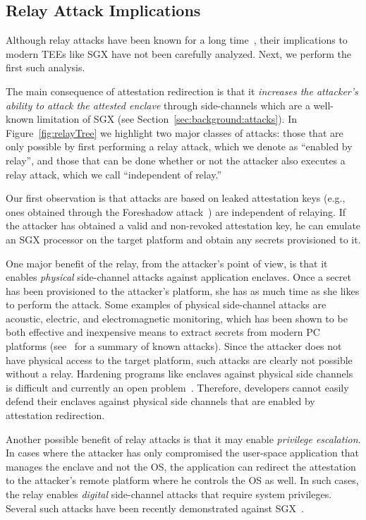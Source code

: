             
\subsection{Relay Attack Implications}
\label{sec:problemStatement:implication}

Although relay attacks have been known for a long time~\cite{parno2008bootstrapping}, their implications to modern TEEs like SGX have not been carefully analyzed. Next, we perform the first such analysis.

The main consequence of attestation redirection is that it \emph{increases the attacker's ability to attack the attested enclave} through side-channels which are a well-known limitation of SGX (see Section~\ref{sec:background:attacks}). In Figure~\ref{fig:relayTree} we highlight two major classes of attacks: those that are only possible by first performing a relay attack, which we denote as ``enabled by relay'', and those that can be done whether or not the attacker also executes a relay attack, which we call ``independent of relay.''


 Our first observation is that attacks are based on leaked attestation keys (e.g., ones obtained through the Foreshadow attack~\cite{foreshadow-usenix18}) are independent of relaying. If the attacker has obtained a valid and non-revoked attestation key, he can emulate an SGX processor on the target platform and obtain any secrets provisioned to it.


 One major benefit of the relay, from the attacker's point of view, is that it enables \emph{physical} side-channel attacks against application enclaves. Once a secret has been provisioned to the attacker's platform, she has as much time as she likes to perform the attack. Some examples of physical side-channel attacks are acoustic, electric, and electromagnetic monitoring, which has been shown to be both effective and inexpensive means to extract secrets from modern PC platforms (see~\cite{genkin2016physical} for a summary of known attacks). Since the attacker does not have physical access to the target platform, such attacks are clearly not possible without a relay. Hardening programs like enclaves against physical side channels is difficult and currently an open problem~\cite{genkin2016physical}. Therefore, developers cannot easily defend their enclaves against physical side channels that are enabled by attestation redirection.


Another possible benefit of relay attacks is that it may enable \emph{privilege escalation}. In cases where the attacker has only compromised the user-space application that manages the enclave and not the OS, the application can redirect the attestation to the attacker's remote platform where he controls the OS as well. In such cases, the relay enables \emph{digital} side-channel attacks that require system privileges. Several such attacks have been recently demonstrated against SGX~\cite{moghimi2017cachezoom, sgxcache, gotzfried2017cache}.


